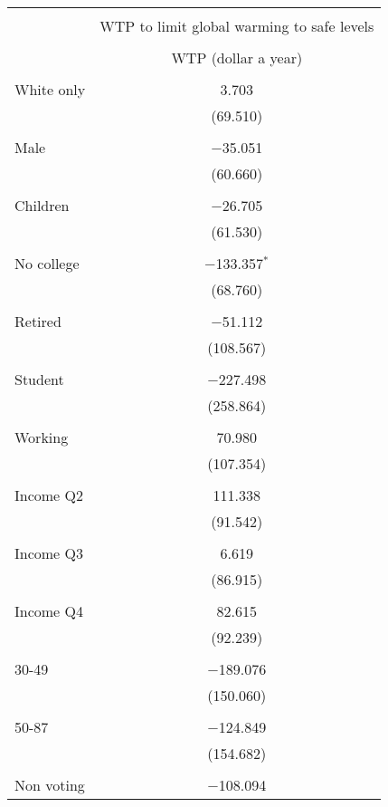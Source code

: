 
\begin{tabular}{@{\extracolsep{5pt}}lc} 
\\[-1.8ex]\hline 
\hline \\[-1.8ex] 
 & \multicolumn{1}{c}{WTP to limit global warming to safe levels} \\ 
\cline{2-2} 
\\[-1.8ex] & WTP (dollar a year) \\ 
\hline \\[-1.8ex] 
 White only & 3.703 \\ 
  & (69.510) \\ 
  & \\ 
 Male & $-$35.051 \\ 
  & (60.660) \\ 
  & \\ 
 Children & $-$26.705 \\ 
  & (61.530) \\ 
  & \\ 
 No college & $-$133.357$^{*}$ \\ 
  & (68.760) \\ 
  & \\ 
 Retired & $-$51.112 \\ 
  & (108.567) \\ 
  & \\ 
 Student & $-$227.498 \\ 
  & (258.864) \\ 
  & \\ 
 Working & 70.980 \\ 
  & (107.354) \\ 
  & \\ 
 Income Q2 & 111.338 \\ 
  & (91.542) \\ 
  & \\ 
 Income Q3 & 6.619 \\ 
  & (86.915) \\ 
  & \\ 
 Income Q4 & 82.615 \\ 
  & (92.239) \\ 
  & \\ 
 30-49 & $-$189.076 \\ 
  & (150.060) \\ 
  & \\ 
 50-87 & $-$124.849 \\ 
  & (154.682) \\ 
  & \\ 
 Non voting & $-$108.094 \\ 

\end{tabular}
